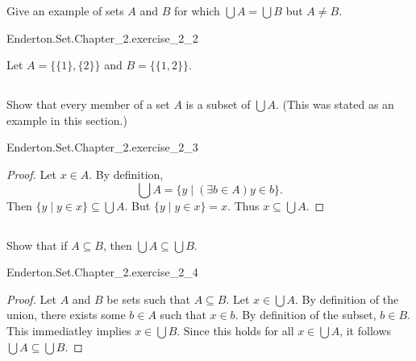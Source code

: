 \documentclass{report}
\begin{document}
  Give an example of sets $A$ and $B$ for which $\bigcup A = \bigcup B$ but
    $A \neq B$.

    {Enderton.Set.Chapter\_2.exercise\_2\_2}

  \begin{answer}
    Let $A = \{\{1\}, \{2\}\}$ and $B = \{\{1, 2\}\}$.
  \end{answer}

\subsection{}%

  Show that every member of a set $A$ is a subset of $\bigcup A$.
  (This was stated as an example in this section.)

    {Enderton.Set.Chapter\_2.exercise\_2\_3}

  \begin{proof}
    Let $x \in A$.
    By definition, $$\bigcup A = \{ y \mid (\exists b \in A) y \in b\}.$$
    Then $\{ y \mid y \in x\} \subseteq \bigcup A$.
    But $\{ y \mid y \in x\} = x$.
    Thus $x \subseteq \bigcup A$.
  \end{proof}

\subsection{}%

  Show that if $A \subseteq B$, then $\bigcup A \subseteq \bigcup B$.

    {Enderton.Set.Chapter\_2.exercise\_2\_4}

  \begin{proof}
    Let $A$ and $B$ be sets such that $A \subseteq B$.
    Let $x \in \bigcup A$.
    By definition of the union, there exists some $b \in A$ such that $x \in b$.
    By definition of the subset, $b \in B$.
    This immediatley implies $x \in \bigcup B$.
    Since this holds for all $x \in \bigcup A$, it follows
      $\bigcup A \subseteq \bigcup B$.
  \end{proof}

\subsection{}%
\end{document}
